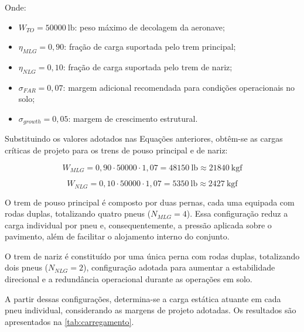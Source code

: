 Onde:

\begin{itemize}
    \item $W_{TO} = 50000\ \text{lb}$: peso máximo de decolagem da aeronave;
    
    \item $\eta_{MLG} = 0,90$: fração de carga suportada pelo trem principal;
    
    \item $\eta_{NLG} = 0,10$: fração de carga suportada pelo trem de nariz;
    
    \item $\sigma_{FAR} = 0,07$: margem adicional recomendada para condições operacionais no solo;
    
    \item $\sigma_{growth} = 0,05$: margem de crescimento estrutural.
\end{itemize}

Substituindo os valores adotados nas Equações anteriores, obtêm-se as cargas críticas de projeto para os trens de pouso principal e de nariz:

\begin{equation}
W_{MLG} = 0,90 \cdot 50000 \cdot 1,07 = 48150\ \text{lb} \approx 21840\ \text{kgf}
\end{equation}

\begin{equation}
W_{NLG} = 0,10 \cdot 50000 \cdot 1,07 = 5350\ \text{lb} \approx 2427\ \text{kgf}
\end{equation}

O trem de pouso principal é composto por duas pernas, cada uma equipada com rodas duplas, totalizando quatro pneus ($N_{MLG}=4$). Essa configuração reduz a carga individual por pneu e, consequentemente, a pressão aplicada sobre o pavimento, além de facilitar o alojamento interno do conjunto.

O trem de nariz é constituído por uma única perna com rodas duplas, totalizando dois pneus ($N_{NLG}=2$), configuração adotada para aumentar a estabilidade direcional e a redundância operacional durante as operações em solo.

A partir dessas configurações, determina-se a carga estática atuante em cada pneu individual, considerando as margens de projeto adotadas. Os resultados são apresentados na \autoref{tab:carregamento}.

